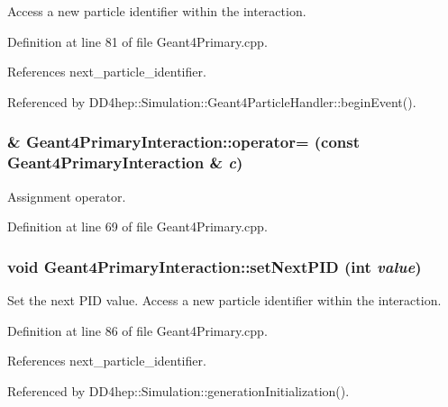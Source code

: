 Access a new particle identifier within the interaction. 

Definition at line 81 of file Geant4Primary.cpp.

References next\_\-particle\_\-identifier.

Referenced by DD4hep::Simulation::Geant4ParticleHandler::beginEvent().\hypertarget{class_d_d4hep_1_1_simulation_1_1_geant4_primary_interaction_a5def4b2b6d8741d91310f05af3336cb6}{
\subsubsection[{operator=}]{ \& Geant4PrimaryInteraction::operator= (const {\bf Geant4PrimaryInteraction} \& {\em c})}}
\label{class_d_d4hep_1_1_simulation_1_1_geant4_primary_interaction_a5def4b2b6d8741d91310f05af3336cb6}


Assignment operator. 

Definition at line 69 of file Geant4Primary.cpp.\hypertarget{class_d_d4hep_1_1_simulation_1_1_geant4_primary_interaction_a18973191ce0e16877f95654c4ee56a30}{
\subsubsection[{setNextPID}]{\setlength{\rightskip}{0pt plus 5cm}void Geant4PrimaryInteraction::setNextPID (int {\em value})}}
\label{class_d_d4hep_1_1_simulation_1_1_geant4_primary_interaction_a18973191ce0e16877f95654c4ee56a30}


Set the next PID value. Access a new particle identifier within the interaction. 

Definition at line 86 of file Geant4Primary.cpp.

References next\_\-particle\_\-identifier.

Referenced by DD4hep::Simulation::generationInitialization().

